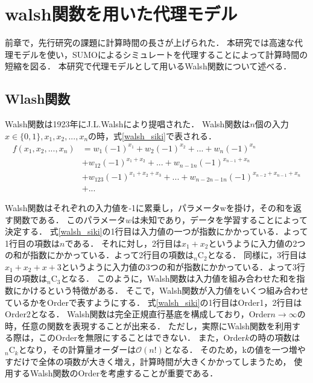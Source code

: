 \documentclass[main]{subfiles}
\begin{document}
\chapter{walsh関数を用いた代理モデル}
    前章で，先行研究の課題に計算時間の長さが上げられた．
    本研究では高速な代理モデルを使い，SUMOによるシミュレートを代理することによって計算時間の短縮を図る．
    本研究で代理モデルとして用いるWalsh関数について述べる．

    \section{Wlash関数}   
    Walsh関数\cite{walsh}は1923年にJ.L.Walshにより提唱された．
    Walsh関数は$n$個の入力$x \in \{0, 1\}, x_1, x_2, ..., x_n$の時，式\ref{walsh_siki}で表される．
    \begin{equation}
        \begin{split}
            f(x_1, x_2, ..., x_n) &= w_1(-1)^{x_1} + w_2(-1)^{x_2} + ... + w_n(-1)^{x_n} \\
            &+ w_{12}(-1)^{x_1+x_2} + ... + w_{n-1n}(-1)^{x_{n-1}+x_n} \\
            &+ w_{123}(-1)^{x_1+x_2+x_3} + ... + w_{n-2n-1n}(-1)^{x_{n-2}+x_{n-1}+x_n} \\
            &+ ...
            \label{walsh_siki}
        \end{split}
    \end{equation}
    
    Walsh関数はそれぞれの入力値を-1に累乗し，パラメータwを掛け，その和を返す関数である．
    このパラメータ$w$は未知であり，データを学習することによって決定する．
    式\ref{walsh_siki}の1行目は入力値の一つが指数にかかっている．よって1行目の項数は$n$である．
    それに対し，2行目は$x_1+x_2$というように入力値の2つの和が指数にかかっている．よって2行目の項数は${}_n \mathrm{C}_2$となる．
    同様に，3行目は$x_1+x_2+x+3$というように入力値の3つの和が指数にかかっている．よって3行目の項数は${}_n \mathrm{C}_3$となる．
    このように，Walsh関数は入力値を組み合わせた和を指数にかけるという特徴がある．
    そこで，Walsh関数が入力値をいくつ組み合わせているかをOrderで表すようにする．
    式\ref{walsh_siki}の1行目はOrder1，2行目はOrder2となる．
    Walsh関数は完全正規直行基底を構成しており，Order$n\to \infty$の時，任意の関数を表現することが出来る．
    ただし，実際にWalsh関数を利用する際は，このOrderを無限にすることはできない．
    また，Order$k$の時の項数は${}_n \mathrm{C}_k$となり，その計算量オーダーは$\mathcal{O}(n!)$となる．
    そのため，kの値を一つ増やすだけで全体の項数が大きく増え，計算時間が大きくかかってしまうため，
    使用するWalsh関数のOrderを考慮することが重要である．
\end{document}
